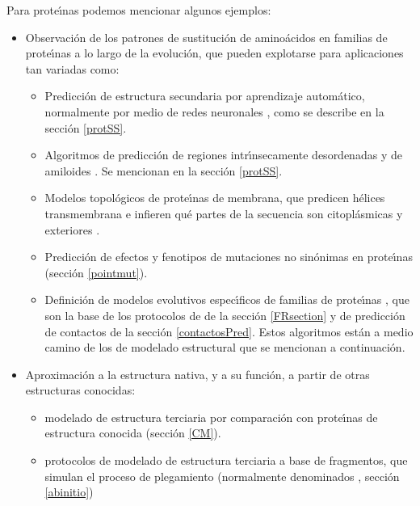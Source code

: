Para prote\'\i{}nas podemos mencionar algunos ejemplos:
\begin{itemize}

\item Observaci\'{o}n de los patrones de sustituci\'{o}n de amino\'{a}cidos en familias de prote\'\i{}nas a lo largo de la evoluci\'{o}n,
que pueden explotarse para aplicaciones tan variadas como:

\begin{itemize}
\item Predicci\'{o}n de estructura secundaria por aprendizaje autom\'{a}tico, normalmente por medio de redes neuronales \citep{Jurtz2017}, 
como se describe en la secci\'{o}n \ref{protSS}.

\item Algoritmos de predicci\'{o}n de regiones intr\'\i{}nsecamente desordenadas \citep{Dunker2008} y de amiloides \citep{Bryan2011,Agostini2012}.
Se mencionan en la secci\'{o}n \ref{protSS}.

\item Modelos topol\'{o}gicos de prote\'\i{}nas de membrana, que predicen h\'{e}lices transmembrana 
e infieren qu\'{e} partes de la secuencia son citopl\'{a}smicas y exteriores \citep{PerezAguilar2012,Nugent2012}.

\item Predicci\'{o}n de efectos y fenotipos de mutaciones no sin\'{o}nimas en prote\'\i{}nas (secci\'{o}n \ref{pointmut}).

\item Definici\'{o}n de modelos evolutivos espec\'\i{}ficos de familias de prote\'\i{}nas \citep{Arenas2017}, 
que son la base de los protocolos de  de la secci\'{o}n \ref{FRsection} y de predicci\'{o}n de contactos 
de la secci\'{o}n \ref{contactosPred}. 
Estos algoritmos est\'{a}n a medio camino de los de modelado estructural que se mencionan a continuaci\'{o}n.

\end{itemize}

\item Aproximaci\'{o}n a la estructura nativa, y a su funci\'{o}n, a partir de otras estructuras conocidas:

\begin{itemize}

\item modelado de estructura terciaria por comparaci\'{o}n con prote\'\i{}nas de estructura conocida %
(secci\'{o}n \ref{CM}). %

\item protocolos de modelado de estructura terciaria a base de fragmentos, que simulan el proceso de 
plegamiento (normalmente denominados , secci\'{o}n \ref{abinitio})

\end{itemize}

\end{itemize}

